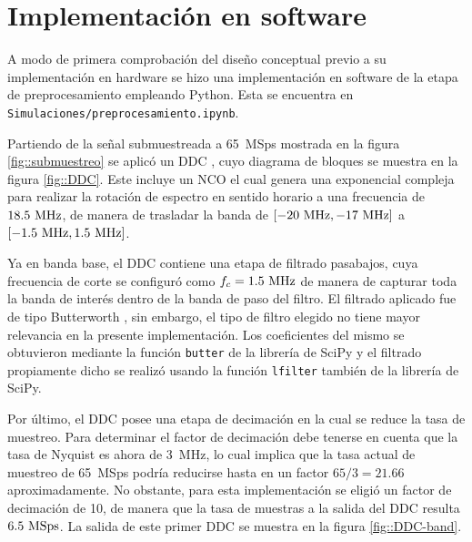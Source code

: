\documentclass[../../main.tex]{subfiles}
\begin{document}

\section{Implementación en software}
A modo de primera comprobación del diseño conceptual previo a su implementación en hardware se hizo una implementación en software de la etapa de preprocesamiento empleando Python. 
Esta se encuentra en \texttt{Simulaciones/preprocesamiento.ipynb}. 

Partiendo de la señal submuestreada a 65~MSps mostrada en la figura \ref{fig::submuestreo} se aplicó un DDC \cite{DDC}, cuyo diagrama de bloques se muestra en la figura \ref{fig::DDC}. 
Este incluye un NCO el cual genera una exponencial compleja para realizar la rotación de espectro en sentido horario a una frecuencia de $18.5~\textrm{MHz}$, de manera de trasladar la banda de $[-20~\textrm{MHz}, -17~\textrm{MHz}]$ a $[-1.5~\textrm{MHz}, 1.5~\textrm{MHz}]$. 

Ya en banda base, el DDC contiene una etapa de filtrado pasabajos, cuya frecuencia de corte se configuró como $f_c = 1.5~\textrm{MHz}$ de manera de capturar toda la banda de interés dentro de la banda de paso del filtro. El filtrado aplicado fue de tipo Butterworth \cite{Butterworth}, sin embargo, el tipo de filtro elegido no tiene mayor relevancia en la presente implementación. Los coeficientes del mismo se obtuvieron mediante la función \texttt{butter} \cite{butter} de la librería de SciPy \cite{scipy} y el filtrado propiamente dicho se realizó usando la función \texttt{lfilter} \cite{lfilter} también de la librería de SciPy. 

Por último, el DDC posee una etapa de decimación en la cual se reduce la tasa de muestreo. Para determinar el factor de decimación debe tenerse en cuenta que la tasa de Nyquist \cite{Nyquist-rate} es ahora de 3~MHz, lo cual implica que la tasa actual de muestreo de 65~MSps podría reducirse hasta en un factor $65/3 = 21.66$ aproximadamente. 
No obstante, para esta implementación se eligió un factor de decimación de 10, de manera que la tasa de muestras a la salida del DDC resulta $6.5~\textrm{MSps}$. La salida de este primer DDC se muestra en la figura \ref{fig::DDC-band}.
\end{document}
